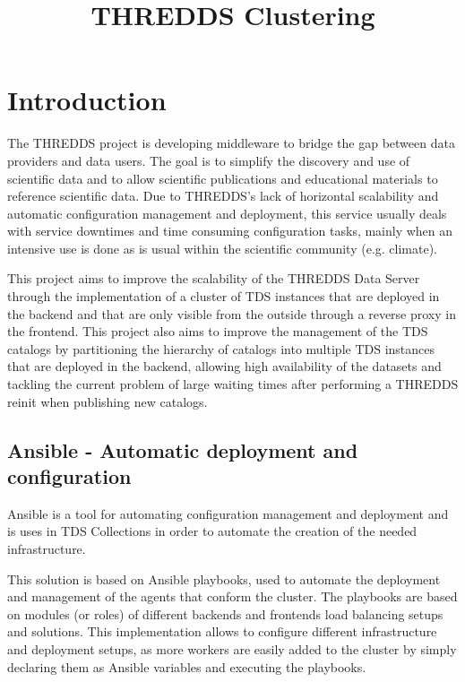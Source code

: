 \documentclass[a4paper,12pt]{article}
\begin{document}
\title{THREDDS Clustering}
\maketitle

\setlength\parindent{0pt}

\section{Introduction}

The THREDDS project is developing middleware to bridge the gap between data providers and data users. The goal is to simplify the discovery and use of scientific data and to allow scientific publications and educational materials to reference scientific data. Due to THREDDS's lack of horizontal scalability and automatic configuration management and deployment, this service usually deals with service downtimes and time consuming configuration tasks, mainly when an intensive use is done as is usual within the scientific community (e.g. climate).

This project aims to improve the scalability of the THREDDS Data Server through the implementation of a cluster of TDS instances that are deployed in the backend and that are only visible from the outside through a reverse proxy in the frontend. This project also aims to improve the management of the TDS catalogs by partitioning the hierarchy of catalogs into multiple TDS instances that are deployed in the backend, allowing high availability of the datasets and tackling the current problem of large waiting times after performing a THREDDS reinit when publishing new catalogs.  

\subsection{Ansible - Automatic deployment and configuration}

Ansible is a tool for automating configuration management and deployment and is uses in TDS Collections in order to automate the creation of the needed infrastructure.

This solution is based on Ansible playbooks, used to automate the deployment and management of the agents that conform the cluster. The playbooks are based on modules (or roles) of different backends and frontends load balancing setups and solutions. This implementation allows to configure different infrastructure and deployment setups, as more workers are easily added to the cluster by simply declaring them as Ansible variables and executing the playbooks.
\end{document}
